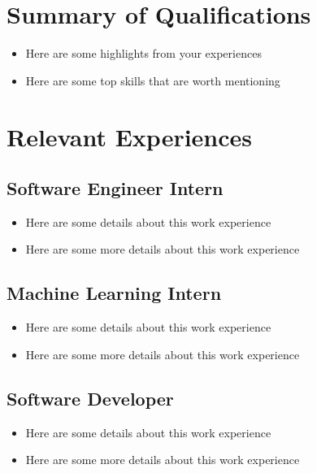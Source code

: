 \documentclass{mxresume}
\begin{document}
\begin{minipage}[t]{0.72\textwidth} %
\begin{resumebody}
\begin{large}
\section*{Summary of Qualifications}
\begin{itemize}[leftmargin=4.5mm] %
\setlength{\itemsep}{0mm}
\item Here are some highlights from your experiences
\item Here are some top skills that are worth mentioning
\end{itemize}
\section*{Relevant Experiences} 
\subsection*{Software Engineer Intern}
\begin{itemize}[leftmargin=4.5mm] %
\setlength{\itemsep}{0mm}
\item Here are some details about this work experience
\item Here are some more details about this work experience
\end{itemize}
\subsection*{Machine Learning Intern}
\begin{itemize}[leftmargin=4.5mm] %
\setlength{\itemsep}{0mm}
\item Here are some details about this work experience
\item Here are some more details about this work experience
\end{itemize}
\subsection*{Software Developer}
\begin{itemize}[leftmargin=4.5mm]
\setlength{\itemsep}{0mm}
\item Here are some details about this work experience
\item Here are some more details about this work experience
\end{itemize}

\end{large}
\end{resumebody}
\end{minipage}
\end{document}
